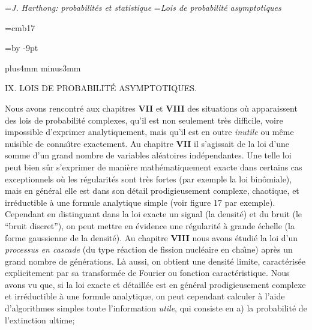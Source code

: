 

\vsize=219mm

\auteurcourant={\sl J. Harthong: probabilit\'es et statistique}
\titrecourant={\sl Lois de probabilit\'e asymptotiques}

 
\font\narrowtit=cmb17

\def\hfq{\hfill\quad} 
\def\cc#1{\hfill#1\quad\hfill} 
\def\tv{\vrule height 30pt depth 6pt width0.4pt} 
\def\punkt{\vrule height0.4pt depth0pt width0.4pt} 

\newdimen\blocksize  \blocksize=\vsize  \advance\blocksize by -9pt 

\def\ara{\hskip-1.5pt} 
\def\asa{\hskip-2pt} 
\def\ata{\hskip-2.5pt} 
\def\aua{\hskip-1pt} 
\def\arb{\hskip1.5pt} 
\def\asb{\hskip2pt} 
\def\atb{\hskip2.5pt} 
\def\aub{\hskip1pt} 
 
\null\vskip10mm plus4mm minus3mm 
 
\centerline{{\tit IX.}\hskip5pt {\narrowtit LOIS DE PROBABILIT\'E
ASYMPTOTIQUES.}} 
 
\vskip10mm 
 
Nous avons rencontr\'e aux chapitres {\bf VII} et {\bf VIII} des  
situations o\`u  apparaissent des lois de probabilit\'e complexes,  
qu'il est non seulement tr\`es difficile, voire impossible d'exprimer 
analytiquement, mais  qu'il est en outre {\it inutile} ou m\^eme nuisible 
de conna{\^\i}tre exactement.  
\medskip 
Au chapitre {\bf VII} il s'agissait de la loi d'une somme d'un 
grand nombre de variables al\'eatoires ind\'ependantes. Une telle loi  
peut bien s\^ur s'exprimer de mani\`ere math\'ematiquement exacte  
dans  certains cas exceptionnels o\`u les r\'egularit\'es sont tr\`es 
fortes (par exemple la loi bin\^omiale),  mais en g\'en\'eral elle est  
dans son d\'etail prodigieusement complexe, chaotique, et irr\'eductible 
\`a une formule analytique simple (voir figure 17 par exemple). 
Cependant en distinguant dans la loi exacte un signal (la densit\'e) et du 
bruit (le ``bruit discret''), on peut mettre en \'evidence une r\'egularit\'e  
\`a grande \'echelle (la forme gaussienne de la densit\'e).   
\medskip 
Au chapitre {\bf VIII} nous avons \'etudi\'e la loi d'un {\it processus en  
cascade} (du type r\'eaction de fission nucl\'eaire en cha{\^\i}ne) apr\`es  
un grand nombre de g\'en\'erations. L\`a aussi, on obtient une densit\'e 
limite, caract\'eris\'ee explicitement par sa transform\'ee de Fourier  
ou fonction caract\'eristique. Nous avons vu que, si la loi exacte et 
d\'etaill\'ee est en g\'en\'eral prodigieusement complexe et 
irr\'eductible \`a une formule analytique, on peut cependant calculer  
\`a l'aide d'algorithmes simples toute l'information {\it utile},  qui 
consiste en    
\smallskip 
a) la probabilit\'e de l'extinction ultime; 
 
